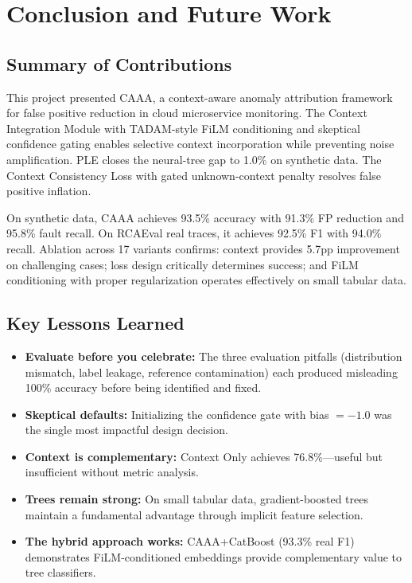 \documentclass[12pt,a4paper]{report}
\newcommand{\sys}{CAAA}
\begin{document}
\chapter{Conclusion and Future Work}

\section{Summary of Contributions}

This project presented \sys{}, a context-aware anomaly attribution framework for false positive reduction in cloud microservice monitoring. The Context Integration Module with TADAM-style FiLM conditioning and skeptical confidence gating enables selective context incorporation while preventing noise amplification. PLE closes the neural-tree gap to 1.0\% on synthetic data. The Context Consistency Loss with gated unknown-context penalty resolves false positive inflation.

On synthetic data, \sys{} achieves 93.5\% accuracy with 91.3\% FP reduction and 95.8\% fault recall. On RCAEval real traces, it achieves 92.5\% F1 with 94.0\% recall. Ablation across 17 variants confirms: context provides 5.7pp improvement on challenging cases; loss design critically determines success; and FiLM conditioning with proper regularization operates effectively on small tabular data.

\section{Key Lessons Learned}

\begin{itemize}
    \item \textbf{Evaluate before you celebrate:} The three evaluation pitfalls (distribution mismatch, label leakage, reference contamination) each produced misleading 100\% accuracy before being identified and fixed.
    \item \textbf{Skeptical defaults:} Initializing the confidence gate with bias $=-1.0$ was the single most impactful design decision.
    \item \textbf{Context is complementary:} Context Only achieves 76.8\%---useful but insufficient without metric analysis.
    \item \textbf{Trees remain strong:} On small tabular data, gradient-boosted trees maintain a fundamental advantage through implicit feature selection.
    \item \textbf{The hybrid approach works:} CAAA+CatBoost (93.3\% real F1) demonstrates FiLM-conditioned embeddings provide complementary value to tree classifiers.
\end{itemize}
\end{document}
